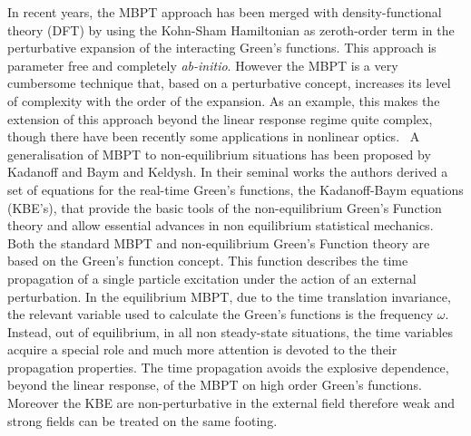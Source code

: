 In recent years, the MBPT approach has been merged with density-functional theory (DFT) by using the Kohn-Sham Hamiltonian as zeroth-order term in the
perturbative expansion of the interacting Green's functions. This approach is parameter free and completely \emph{ab-initio}.\cite{Onida}  
However the MBPT is a very cumbersome technique that, based on a perturbative concept, increases its level of complexity with
the order of the expansion. As an example, this makes the extension of this approach beyond the linear response regime quite complex, though there have been recently some applications in nonlinear optics.~\cite{Chang2002,Leitsmann2005,PhysRevB.82.235201}
A generalisation of MBPT to non-equilibrium situations has been proposed by Kadanoff and Baym and Keldysh.\cite{kadanoffbaym} 
In their seminal works the authors derived a set of equations for the real-time Green's functions, the Kadanoff-Baym equations (KBE's), that provide the basic tools of the non-equilibrium Green's Function theory and allow essential advances in non equilibrium statistical mechanics.\cite{kadanoffbaym}   
Both the standard MBPT and non-equilibrium Green's Function theory are based on
the Green's function concept. This function describes the time propagation of a single particle excitation under the action of an external perturbation.  
In the equilibrium MBPT, due to the time translation invariance,
the relevant variable used to calculate the Green's functions is the frequency $\omega$. Instead, out of equilibrium, in all non steady-state situations, the time variables acquire a special role and much more attention is devoted to the their propagation properties. 
The time propagation avoids the explosive dependence, beyond the linear response, of the MBPT on high order Green's functions. Moreover the KBE are
non-perturbative in the external field therefore weak and strong fields can be treated on the same footing. 

